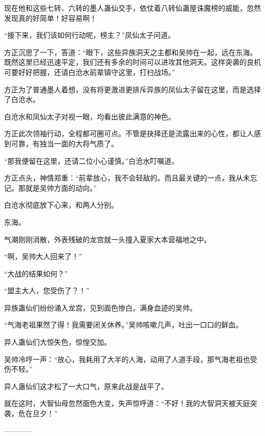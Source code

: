 \begin{this_body}
现在他和这些七转、六转的墨人蛊仙交手，依仗着八转仙蛊屋诛魔榜的威能，忽然发现真的好简单！好容易啊！

“接下来，我们该如何行动呢，榜主？”凤仙太子问道。

方正沉思了一下，答道：“眼下，这些异族洞天之主都和吴帅在一起，远在东海。既然这里已经迅速平定，我们还有多余的时间可以进攻其他洞天。这样突袭的良机可要好好把握，还请白沧水前辈镇守这里，打扫战场。”

方正为了普通墨人着想，没有将更激进更排斥异族的凤仙太子留在这里，而是选择了白沧水。

白沧水和凤仙太子对视一眼，均看出彼此满意的神色。

方正此次领袖行动，全程都可圈可点。不管是抉择还是流露出来的心性，都让人感到可靠，有独当一面的大将气质了。

“那我便留在这里，还请二位小心谨慎。”白沧水叮嘱道。

方正点头，神情郑重：“前辈放心，我不会轻敌的。而且最关键的一点，我从未忘记。那就是吴帅方面的动向。”

白沧水彻底放下心来，和两人分别。

东海。

气潮刚刚消散，外表残破的龙宫就一头撞入夏家大本营福地之中。

“啊，吴帅大人回来了！”

“大战的结果如何？”

“盟主大人，您受伤了？！”

异族蛊仙们纷纷涌入龙宫，见到面色惨白，满身血迹的吴帅。

“气海老祖果然了得！我需要闭关休养。”吴帅咳嗽几声，吐出一口口的鲜血。

异人蛊仙们大惊失色，惊惶交加。

吴帅冷哼一声：“放心，我耗用了大半的人海，动用了人道手段，那气海老祖也受伤不轻。”

异人蛊仙们这才松了一大口气，原来此战是战平了。

就在这时，大智仙母忽然面色大变，失声惊呼道：“不好！我的大智洞天被天庭突袭，危在旦夕！”

------------

\end{this_body}

